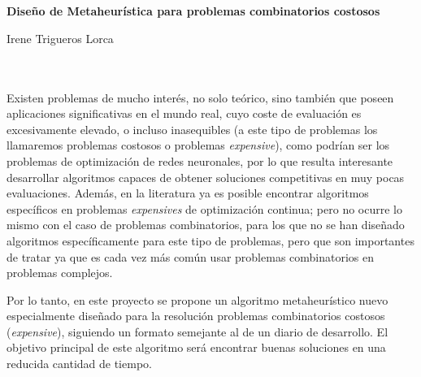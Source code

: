 \chapter*{}






\cleardoublepage
\thispagestyle{empty}

\begin{center}
{\large\bfseries Diseño de Metaheurística para problemas combinatorios costosos}\\
\end{center}
\begin{center}
Irene Trigueros Lorca\\
\end{center}

\\

\vspace{0.7cm}
\\

Existen problemas de mucho interés, no solo teórico, sino también que poseen aplicaciones significativas en el mundo real, cuyo coste de evaluación es excesivamente elevado, o incluso inasequibles (a este tipo de problemas los llamaremos problemas costosos o problemas \textit{expensive}), como podrían ser los problemas de optimización de redes neuronales, por lo que resulta interesante desarrollar algoritmos capaces de obtener soluciones competitivas en muy pocas evaluaciones. 
Además, en la literatura ya es posible encontrar algoritmos específicos en problemas \textit{expensives} de optimización continua; pero no ocurre lo mismo con el caso de problemas combinatorios, para los que no se han diseñado algoritmos específicamente para este tipo de problemas, pero que son importantes de tratar ya que es cada vez más común usar problemas combinatorios en problemas complejos.

Por lo tanto, en este proyecto se propone un algoritmo metaheurístico nuevo especialmente diseñado para la resolución problemas combinatorios costosos (\textit{expensive}), siguiendo un formato semejante al de un diario de desarrollo. 
El objetivo principal de este algoritmo será encontrar buenas soluciones en una reducida cantidad de tiempo. 

